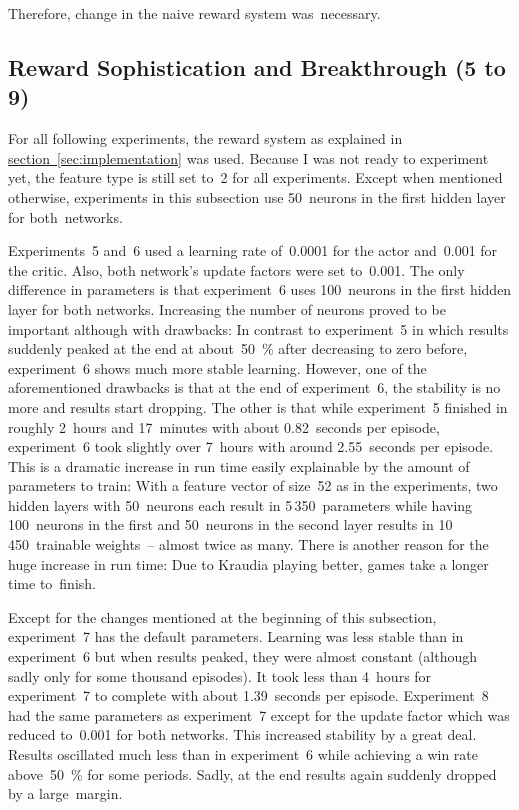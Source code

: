 \documentclass[a4paper,titlepage]{article}
\begin{document}
Therefore, change in the naive reward system was~necessary.

\subsection{Reward Sophistication and Breakthrough (5 to 9)}

For all following experiments, the reward system as explained in \hyperref[sec:implementation]{section~\ref*{sec:implementation}} was used. Because I was not ready to experiment yet, the feature type is still set to~2 for all experiments. Except when mentioned otherwise, experiments in this subsection use 50~neurons in the first hidden layer for both~networks.

Experiments~5 and~6 used a learning rate of~0.0001 for the actor and~0.001 for the critic. Also, both network's update factors were set to~0.001. The only difference in parameters is that experiment~6 uses 100~neurons in the first hidden layer for both networks.
Increasing the number of neurons proved to be important although with drawbacks: In contrast to experiment~5 in which results suddenly peaked at the end at about~50~\% after decreasing to zero before, experiment~6 shows much more stable learning. However, one of the aforementioned drawbacks is that at the end of experiment~6, the stability is no more and results start dropping. The other is that while experiment~5 finished in roughly 2~hours and 17~minutes with about 0.82~seconds per episode, experiment~6 took slightly over 7~hours with around 2.55~seconds per episode. This is a dramatic increase in run time easily explainable by the amount of parameters to train: With a feature vector of size~52 as in the experiments, two hidden layers with 50~neurons each result in 5\,350~parameters while having 100~neurons in the first and 50~neurons in the second layer results in 10\,450~trainable weights~--  almost twice as many. There is another reason for the huge increase in run time: Due to Kraudia playing better, games take a longer time to~finish.

Except for the changes mentioned at the beginning of this subsection, experiment~7 has the default parameters. Learning was less stable than in experiment~6 but when results peaked, they were almost constant (although sadly only for some thousand episodes). It took less than 4~hours for experiment~7 to complete with about 1.39~seconds per episode. Experiment~8 had the same parameters as experiment~7 except for the update factor which was reduced to~0.001 for both networks. This increased stability by a great deal. Results oscillated much less than in experiment~6 while achieving a win rate above~50~\% for some periods. Sadly, at the end results again suddenly dropped by a large~margin.
\end{document}
